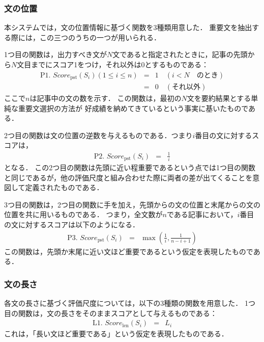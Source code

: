 \subsubsection{文の位置}

本システムでは，文の位置情報に基づく関数を3種類用意した．
重要文を抽出する際には，この三つのうちの一つが用いられる．

1つ目の関数は，出力すべき文が\(N\)文であると指定されたときに，記事の先頭から\(N\)文目までにスコア1をつけ，それ以外は0とするものである：
\begin{eqnarray*}
\mbox{P1. }
 Score_{\mbox{pst}}(S_i) (1 \le i \le n) & = & 1 \quad (i < N \quad のとき) \\[-1mm]
                            & = & 0 \quad (\mbox{それ以外})
\end{eqnarray*}
ここで\(n\)は記事中の文の数を示す．
この関数は，最初の\(N\)文を要約結果とする単純な重要文選択の方法が
好成績を納めてきているという事実に基いたものである．

2つ目の関数は文の位置の逆数を与えるものである．つまり\(i\)番目の文に対するスコアは，
\begin{eqnarray*}
\mbox{P2. }
 Score_{\mbox{pst}}(S_i) & = & \frac{1}{i}
\end{eqnarray*}
となる．
この2つ目の関数は先頭に近い程重要であるという点では1つ目の関数と同じであるが，他の評価尺度と組み合わせた際に両者の差が出てくることを意図して定義されたものである．

3つ目の関数は，2つ目の関数に手を加え，先頭からの文の位置と末尾からの文の位置を共に用いるものである．
つまり，全文数が\(n\)である記事において，\(i\)番目の文に対するスコアは以下のようになる．
\begin{eqnarray*}
\mbox{P3. }
 Score_{\mbox{pst}}(S_i) & = & \max(\frac{1}{i}, \frac{1}{n - i + 1})
\end{eqnarray*}
この関数は，先頭か末尾に近い文ほど重要であるという仮定を表現したものである．

\subsubsection{文の長さ}

各文の長さに基づく評価尺度については，以下の3種類の関数を用意した．
1つ目の関数は，文の長さをそのままスコアとして与えるものである：
\begin{eqnarray*}
\mbox{L1. }
 Score_{\mbox{len}}(S_i) & = & L_i
\end{eqnarray*}
これは，「長い文ほど重要である」という仮定を表現したものである．

